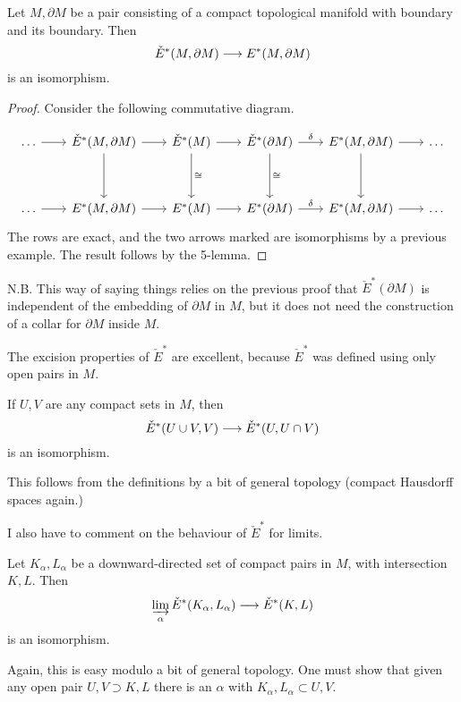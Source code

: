 \documentclass[../main]{subfiles}
\begin{document}
\begin{examples}
Let $M, \partial M$ be a pair consisting of a compact topological manifold with boundary and its boundary. Then 
\[\check{E}^*(M,\partial M) \longrightarrow E^*(M,\partial M)\]
is an isomorphism.
\end{examples}
\begin{proof}
Consider the following commutative diagram.

\[
\begin{tikzcd}[column sep = 2em]
\dots \arrow[r] & {\check{E}^\ast(M,\partial M)} \arrow[r] \arrow[dd] & \check{E}^\ast(M) \arrow[dd, "\cong"] \arrow[r] & \check{E}^\ast(\partial M) \arrow[dd, "\cong"] \arrow[r, "\delta"] & {E^\ast(M,\partial M)} \arrow[dd] \arrow[r] & \dots \\
                &                                                     &                                                 &                                                                    &                                             &       \\
\dots \arrow[r] & {E^\ast(M,\partial M)} \arrow[r]                    & E^\ast(M) \arrow[r]                             & E^\ast(\partial M) \arrow[r, "\delta"]                             & {E^\ast(M,\partial M)} \arrow[r]            & \dots
\end{tikzcd}
\]
The rows are exact, and the two arrows marked are isomorphisms by a previous example. The result follows by the 5-lemma.
\end{proof}

N.B. This way of saying things relies on the previous proof that $\check{E}^*(\partial M)$ is independent of the embedding of $\partial M$ in $M$, but it does not need the construction of a collar for $\partial M$ inside $M$.

The excision properties of $\check{E}^*$ are excellent, because $\check{E}^*$ was defined using only open pairs in $M$.
\begin{proposition}\label{prop:p3c10.4}
If $U,V$ are any compact sets in $M$, then
\[\check{E}^*(U \cup V,V) \longrightarrow \check{E}^*(U,U \cap V)\]
is an isomorphism.
\end{proposition}

This follows from the definitions by a bit of general topology (compact Hausdorff spaces again.)

I also have to comment on the behaviour of $\check{E}^*$ for limits.
\begin{proposition}\label{prop:p3c10.5}
Let $K_\alpha,L_\alpha$ be a downward-directed set of compact pairs in $M$, with intersection $K,L$. Then 
\[\varinjlim_{\alpha} \check{E}^*(K_\alpha,L_\alpha) \longrightarrow \check{E}^*(K,L)\]
is an isomorphism.
\end{proposition}
Again, this is easy modulo a bit of general topology. One must show that given any open pair $U,V \supset K,L$ there is an $\alpha$ with $K_\alpha,L_\alpha \subset U,V$.
\end{document}
